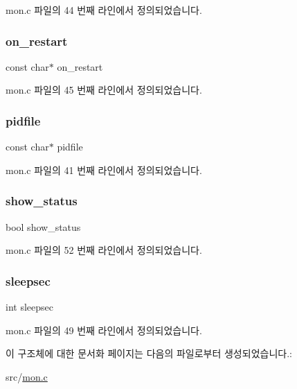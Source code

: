 mon.\+c 파일의 44 번째 라인에서 정의되었습니다.

\mbox{\label{structmonitor__t_a09314c308617f1b0d43b0fda3534e6bc}} 
\subsubsection{\texorpdfstring{on\+\_\+restart}{on\_restart}}
{\footnotesize\ttfamily const char$\ast$ on\+\_\+restart}



mon.\+c 파일의 45 번째 라인에서 정의되었습니다.

\mbox{\label{structmonitor__t_a8830aa2e0c02643ac374c22a7ec45927}} 
\subsubsection{\texorpdfstring{pidfile}{pidfile}}
{\footnotesize\ttfamily const char$\ast$ pidfile}



mon.\+c 파일의 41 번째 라인에서 정의되었습니다.

\mbox{\label{structmonitor__t_a205230e4a8d4dffa50c61ca0c433c2f5}} 
\subsubsection{\texorpdfstring{show\+\_\+status}{show\_status}}
{\footnotesize\ttfamily bool show\+\_\+status}



mon.\+c 파일의 52 번째 라인에서 정의되었습니다.

\mbox{\label{structmonitor__t_acde0aafaec476d70d238a3bb241c2f57}} 
\subsubsection{\texorpdfstring{sleepsec}{sleepsec}}
{\footnotesize\ttfamily int sleepsec}



mon.\+c 파일의 49 번째 라인에서 정의되었습니다.



이 구조체에 대한 문서화 페이지는 다음의 파일로부터 생성되었습니다.\+:\begin{DoxyCompactItemize}
\item 
src/\mbox{\hyperlink{mon_8c}{mon.\+c}}\end{DoxyCompactItemize}
